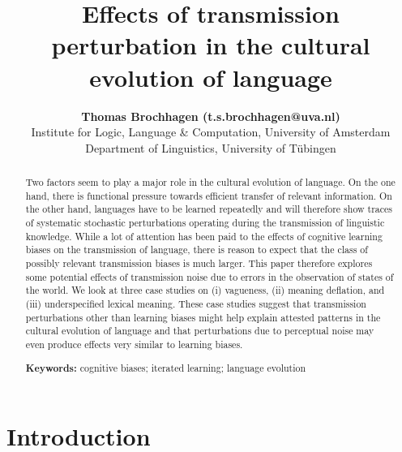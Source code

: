 \documentclass[10pt,a4paper]{article}
\title{Effects of transmission perturbation in the cultural evolution of language}
\author{{\large \bf Thomas Brochhagen (t.s.brochhagen@uva.nl)}\\
  Institute for Logic, Language \& Computation, University of Amsterdam
  \AND {\large \bf Michael Franke (mchfranke@gmail.com)} \\
  Department of Linguistics, University of T\"{u}bingen}
\begin{document}
\maketitle

\begin{abstract}
  Two factors seem to play a major role in the cultural evolution of language. On the one
  hand, there is functional pressure towards efficient transfer of relevant information. On the
  other hand, languages have to be learned repeatedly and will therefore show traces of
  systematic stochastic perturbations operating during the transmission of linguistic
  knowledge. While a lot of attention has been paid to the effects of cognitive learning biases
  on the transmission of language, there is reason to expect that the class of possibly
  relevant transmission biases is much larger. This paper therefore explores some potential
  effects of transmission noise due to errors in the observation of states of the world. We
  look at three case studies on (i) vagueness, (ii) meaning deflation, and (iii) underspecified
  lexical meaning. These case studies suggest that transmission perturbations other than
  learning biases might help explain attested patterns in the cultural evolution of language
  and that perturbations due to perceptual noise may even produce effects very
  similar to learning biases.

\textbf{Keywords:} 
cognitive biases; iterated learning; language evolution  
\end{abstract}


\section{Introduction}
\end{document}
